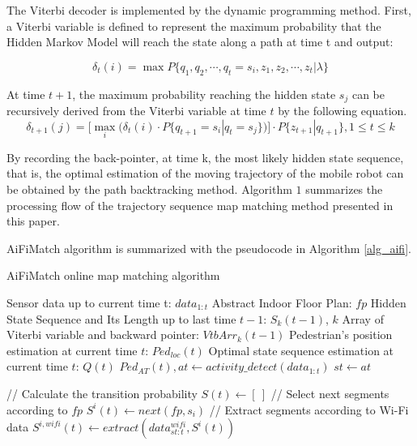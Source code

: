 \documentclass{llncs}
\begin{document}
The Viterbi decoder is implemented by the dynamic programming method. First, a Viterbi variable is defined to represent the maximum probability that the Hidden Markov Model will reach the state along a path at time t and output:

\begin{equation}
	{\delta _t}(i) = \max P\{ {q_1},{q_2}, \cdots ,{q_t} = {s_i},{z_1},{z_2}, \cdots ,{z_t}|\lambda \}
\end{equation}

At time $t+1$, the maximum probability reaching the hidden state $s_j$ can be recursively derived from the Viterbi variable at time $t$ by the following equation. 
\begin{equation}
	{\delta _{t + 1}}(j) = [\mathop {\max }\limits_i ({\delta _t}(i) \cdot P\{ {q_{t + 1}} = {s_i}|{q_t} = {s_j}\} )] \cdot P\{ {z_{t + 1}}|{q_{t + 1}}\} ,1 \le t \le k
\end{equation}

By recording the back-pointer, at time k, the most likely hidden state sequence, that is, the optimal estimation of the moving trajectory of the mobile robot can be obtained by the path backtracking method. Algorithm $1$ summarizes the processing flow of the trajectory sequence map matching method presented in this paper.

AiFiMatch algorithm is summarized with the pseudocode in Algorithm \ref{alg_aifi}.  

\vspace{-10pt}
\begin{algorithm}[H]
	\caption{AiFiMatch online map matching algorithm}
	\label{alg_aifi}
	\begin{algorithmic}[1]
		\renewcommand{\algorithmicrequire}{\textbf{Input:}}
		\renewcommand{\algorithmicensure}{\textbf{Output:}}
		\REQUIRE Sensor data up to current time t: $data_{1:t}$
		\REQUIRE Abstract Indoor Floor Plan: $fp$
		\REQUIRE Hidden State Sequence and Its Length up to last time $t-1$: $S_{k}(t-1)$, $k$
		\REQUIRE Array of Viterbi variable and backward pointer: ${VtbArr}_{k}(t-1)$
		\ENSURE Pedestrian's position estimation at current time $t$: $Ped_{loc}(t)$
		\ENSURE Optimal state sequence estimation at current time $t$: $Q(t)$
		\STATE ${Ped_{AT}(t)}, at \leftarrow activity\_detect({data_{1:t}})$
		\STATE ${st} \leftarrow {at}$  
		
		\STATE // Calculate the transition probability
		\STATE $S(t) \leftarrow [\ ]$
		\STATE // Select next segments according to $fp$
		\STATE $S^{i}(t) \leftarrow next(fp,s_i)$
		\STATE // Extract segments according to Wi-Fi data
		\STATE $S^{i,wifi}(t) \leftarrow extract(data_{st:t}^{wifi},S^{i}(t))$
				
	\end{algorithmic}
\end{algorithm}
		
\end{document}
